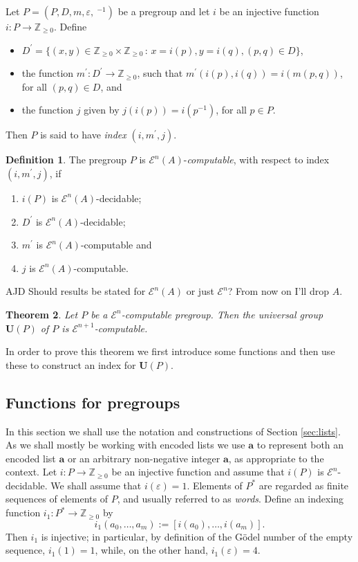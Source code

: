 \documentclass[a4paper]{article}
\newcommand{\grz}[1]{$\mathcal{E}^{#1}$}	%
\newcommand{\Zpos}{\mathbb{Z}_{\geq 0}}
\newcommand{\maps}{\longrightarrow}
\newcommand\eps{\varepsilon}
\newcommand{\avec}{\mathbf{a}}	%
\newcommand{\Uvec}{\mathbf{U}}	%
\newcommand{\UP}{\Uvec(P)}
\newcommand{\be}{\begin{enumerate}}
\newcommand{\ee}{\end{enumerate}}
\theoremstyle{plain}
\newtheorem{theorem}{Theorem}[section]
\theoremstyle{definition}
\newtheorem{definition}[theorem]{Definition}
\newenvironment{ad}{\noindent\color{blue} AJD }{}
\newcommand{\ajd}[1]{
\begin{ad} #1 \end{ad}}
\begin{document}
Let $P=(P,D,m,\eps,~^{-1})$ be a pregroup and let $i$ be an injective function $i:P\maps \Zpos$.
Define 
\begin{itemize}
\item $D^\prime=
\{(x,y)\in \Zpos\times \Zpos\,:\, x=i(p), y=i(q), (p,q)\in D\}$,
\item 
the function 
$m^\prime:D^\prime \maps \Zpos$, such that $m^\prime(i(p),i(q))=i(m(p,q))$, 
for 
all $(p,q)\in D$,  
and 
\item the function $j$  given
by $j(i(p))=i(p^{-1})$, for all $p\in P$.
\end{itemize}
Then $P$ is said to have 
{\em index} $(i,m^\prime,j)$. 
\begin{definition}
The pregroup $P$ is \grz{n}$(A)$-\emph{computable}, with respect to
index $(i,m^\prime,j)$, if 
\be
\item $i(P)$ is \grz{n}$(A)$-decidable;
\item $D^\prime$ is \grz{n}$(A)$-decidable;
\item $m^\prime$ is \grz{n}$(A)$-computable and 
\item $j$ is \grz{n}$(A)$-computable.
\ee
\end{definition}
\ajd{Should results be stated for \grz{n}$(A)$ or just \grz{n}? From now on I'll drop $A$.}


\begin{theorem}\label{thm:UPgrz} Let $P$ be a \grz{n}-computable pregroup. Then the universal group $\UP$ of $P$  
is \grz{n+1}-computable.
\end{theorem}

In order to prove this theorem we first introduce some functions and then use these to construct
an index for $\UP$. 

\subsection{Functions for pregroups}
In this section we shall use the notation and constructions  of
Section \ref{sec:lists}. As we shall mostly be working with encoded lists we use 
$\avec$ to represent both an encoded list $\avec$ or an arbitrary non-negative integer $\avec$, 
as appropriate to
the context. 
Let $i:P\maps \Zpos$ be an injective function and assume that $i(P)$ is \grz{n}-decidable.
We shall assume that $i(\eps)=1$.   
Elements of $P^*$ are regarded as finite sequences of elements of $P$, and 
usually referred to as \emph{words}.  Define an indexing function
$i_1:P^*\maps \Zpos$ by 
\begin{equation}\label{eq:imonoid}
i_1(a_0,\ldots,a_m):=[i(a_0),\ldots ,i(a_m)].
\end{equation} 
Then $i_1$ is injective; in particular, by definition of the
G\"odel number of the empty sequence,  
$i_1(1)=1$, while,  on the other hand, $i_1(\eps)= 4$.  
\end{document}
